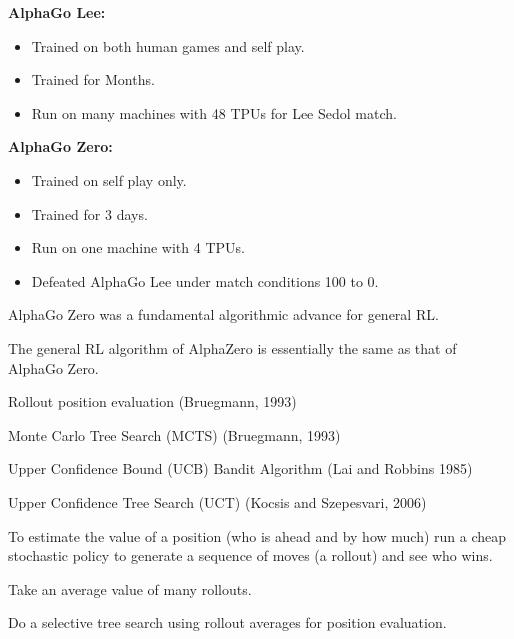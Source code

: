 {

{\bf AlphaGo Lee:}

\begin{itemize}
\item Trained on both human games and self play.
  
\item Trained for Months.

\item Run on many machines with 48 TPUs for Lee Sedol match.
\end{itemize}

{\bf AlphaGo Zero:}
\begin{itemize}
\item Trained on self play only.
  
\item Trained for 3 days.

\item Run on one machine with 4 TPUs.

\item Defeated AlphaGo Lee under match conditions 100 to 0.
\end{itemize}


AlphaGo Zero was a fundamental algorithmic advance for general RL.

\vfill
The general RL algorithm of AlphaZero is essentially the same as that of AlphaGo Zero.


Rollout position evaluation (Bruegmann, 1993)

\vfill
Monte Carlo Tree Search (MCTS) (Bruegmann, 1993)

\vfill
Upper Confidence Bound (UCB) Bandit Algorithm (Lai and Robbins 1985)

\vfill
Upper Confidence Tree Search (UCT) (Kocsis and Szepesvari, 2006)


To estimate the value of a position (who is ahead and by how much)
run a cheap stochastic policy to generate a sequence of moves (a rollout) and see who wins.

\vfill
Take an average value of many rollouts.

\vfill
Do a selective tree search using rollout averages for position evaluation.


}
